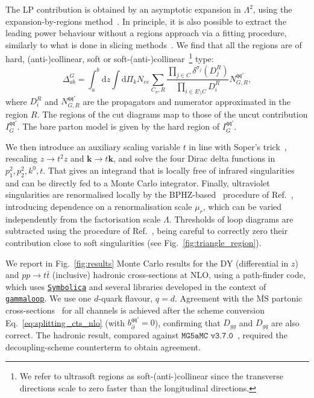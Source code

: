 \documentclass[%
 reprint,
 amsmath,amssymb,
 superscriptaddress,
 aps,
 preprintnumbers,
prl,
floatfix,
]{revtex4-2}
\begin{document}
The LP contribution is obtained by an asymptotic expansion in $\Lambda^2$, using the expansion-by-regions method~\cite{Chetyrkin:1988zz,Gorishnii:1989dd,etde_6475136,Beneke:1997zp,Jantzen:2011nz,Gardi:2022khw}. In principle, it is also possible to extract the leading power behaviour without a regions approach via a fitting procedure, similarly to what is done in slicing methods~\cite{Catani_2007}.
We find that all the regions are of hard, (anti-)collinear, soft or soft-(anti-)collinear~\footnote{We refer to ultrasoft regions as soft-(anti-)collinear since the transverse directions scale to zero faster than the longitudinal directions.} type:
\begin{equation}
\Delta_{ab}^G=\! \int_{a}^b \mathrm{d}z\int\mathrm{d}\Pi_k N_{ee}\sum_{C_\sigma, R} \frac{\prod_{j\in C} \delta^{\sigma_j}(D_j^R)}{\prod_{i\in E\setminus C }D_i^R}N^{\mathfrak{q}\mathfrak{q}'}_{G,R},
\end{equation}
where $D_i^R$ and $N^{\mathfrak{q}\mathfrak{q}'}_{G,R}$ are the propagators and numerator approximated in the region $R$.
The regions of the cut diagrams map to those of the uncut contribution $I_{ G}^{\mathfrak{q}\mathfrak{q}'}$.
The bare parton model is given by the hard region of $I_{ G}^{\mathfrak{q}\mathfrak{q}'}$. 

We then introduce an auxiliary scaling variable $t$ in line with Soper's trick~\cite{Soper_2000,Capatti:2020xjc}, rescaling $z\rightarrow t^2 z$ and $\mathbf{k}\rightarrow t \mathbf{k}$, and solve the four Dirac delta functions in $p_1^2,p_2^2,k^0,t$.
That gives an integrand that is locally free of infrared singularities and can be directly fed to a Monte Carlo integrator.
Finally, ultraviolet singularities are renormalised locally by the BPHZ-based~\cite{BogoliubowParasiuk1957,Zimmermann1969,Hepp1966} procedure of Ref.~\cite{Capatti:2022tit}, introducing dependence on a renormalisation scale $\mu_r$, which can be varied independently from the factorisation scale $\Lambda$.
Thresholds of loop diagrams are subtracted using the procedure of Ref.~\cite{Kermanschah:2021wbk}, being careful to correctly zero their contribution close to soft singularities (see Fig.~\ref{fig:triangle_region}).





We report in Fig.~\ref{fig:results} Monte Carlo results for the DY (differential in $z$) and $pp\rightarrow t \bar{t}$ (inclusive) hadronic cross-sections at NLO, using a path-finder code, which uses \href{https://symbolica.io/}{\texttt{Symbolica}} and several libraries developed in the context of \href{https://github.com/alphal00p/gammaloop}{\texttt{gammaloop}}.
We use one $d$-quark flavour, $q=d$.
Agreement with the $\overline{\text{MS}}$ partonic cross-sections~\cite{Altarelli:1979ub,Czakon:2008ii, 1988NuPhB.303..607N} for all channels is achieved after the scheme conversion Eq.~\eqref{eq:splitting_cts_nlo} (with $b_\partial^{\mathfrak{q}\mathfrak{q}'}=0$), confirming that $D_{gg}$ and $D_{gq}$ are also correct.
The hadronic result, compared against $\texttt{MG5aMC v3.7.0}$~\cite{Alwall:2014hca}, required the decoupling-scheme counterterm to obtain agreement.
\end{document}
